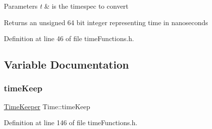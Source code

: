 \begin{DoxyParams}{Parameters}
{\em t} & is the timespec to convert \\
\hline
\end{DoxyParams}
\begin{DoxyReturn}{Returns}
an unsigned 64 bit integer representing time in nanoseconds 
\end{DoxyReturn}


Definition at line 46 of file time\+Functions.\+h.



\subsection{Variable Documentation}
\mbox{\label{namespaceTime_a321ca5eba84577aaaaeb2a79d28806c8}} 
\subsubsection{\texorpdfstring{time\+Keep}{timeKeep}}
{\footnotesize\ttfamily \hyperlink{classTime_1_1TimeKeeper}{Time\+Keeper} Time\+::time\+Keep}



Definition at line 146 of file time\+Functions.\+h.

